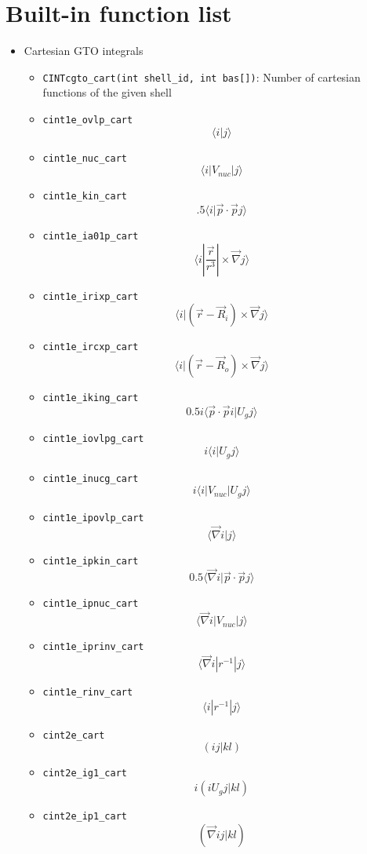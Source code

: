 \documentclass{article}
\begin{document}
\section{Built-in function list}

\begin{itemize}
\item
  Cartesian GTO integrals
  \begin{itemize}
  \item
    \verb!CINTcgto_cart(int shell_id, int bas[])!: Number of cartesian
    functions of the given shell
  \item
    \verb!cint1e_ovlp_cart! \[\langle i| j\rangle \]
  \item
    \verb!cint1e_nuc_cart! \[\langle i| V_{nuc} | j\rangle \]
  \item
    \verb!cint1e_kin_cart!
    \[.5\langle i| \vec{p} \cdot \vec{p} j\rangle \]
  \item
    \verb!cint1e_ia01p_cart!
    \[\langle i| \frac{\vec{r}}{r^3}| \times \vec{\nabla} j\rangle \]
  \item
    \verb!cint1e_irixp_cart!
    \[\langle i| (\vec{r}-\vec{R}_i) \times \vec{\nabla} j\rangle \]
  \item
    \verb!cint1e_ircxp_cart!
    \[\langle i| (\vec{r}-\vec{R}_o) \times \vec{\nabla} j\rangle \]
  \item
    \verb!cint1e_iking_cart!
    \[0.5i\langle \vec{p} \cdot \vec{p} i| U_gj\rangle \]
  \item
    \verb!cint1e_iovlpg_cart! \[i \langle i| U_gj\rangle \]
  \item
    \verb!cint1e_inucg_cart! \[i \langle i| V_{nuc}| U_gj\rangle \]
  \item
    \verb!cint1e_ipovlp_cart! \[\langle \vec{\nabla} i|j\rangle \]
  \item
    \verb!cint1e_ipkin_cart!
    \[0.5\langle \vec{\nabla} i| \vec{p} \cdot \vec{p} j\rangle \]
  \item
    \verb!cint1e_ipnuc_cart!
    \[\langle \vec{\nabla} i| V_{nuc}|j\rangle \]
  \item
    \verb!cint1e_iprinv_cart!
    \[\langle \vec{\nabla} i| r^{-1}|j\rangle \]
  \item
    \verb!cint1e_rinv_cart! \[\langle i| r^{-1} |j\rangle \]
  \item
    \verb!cint2e_cart! \[(ij|kl)\]
  \item
    \verb!cint2e_ig1_cart! \[i(i U_g j|kl)\]
  \item
    \verb!cint2e_ip1_cart! \[(\vec{\nabla} i j|kl)\]

\end{itemize}
\end{itemize}
\end{document}
